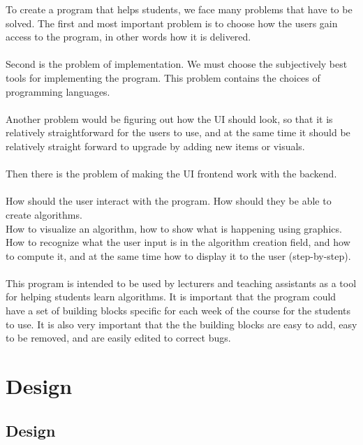 \documentclass[11pt]{article}
\begin{document}
To create a program that helps students, we face many problems that have to be solved. The first and most important problem is to choose how the users gain access to the program, in other words how it is delivered.
\\\\
Second is the problem of implementation. We must choose the subjectively best tools for implementing the program. This problem contains the choices of programming languages.
\\\\
Another problem would be figuring out how the UI should look, so that it is relatively straightforward for the users to use, and at the same time it should be relatively straight forward to upgrade by adding new items or visuals.
\\\\
Then there is the problem of making the UI frontend work with the backend.\\\\
How should the user interact with the program. How should they be able to create algorithms.\\
How to visualize an algorithm, how to show what is happening using graphics.\\
How to recognize what the user input is in the algorithm creation field, and how to compute it, and at the same time how to display it to the user (step-by-step).\\\\
This program is intended to be used by lecturers and teaching assistants as a tool for helping students learn algorithms. It is important that the program could have a set of building blocks specific for each week of the course for the students to use. It is also very important that the the building blocks are easy to add, easy to be removed, and are easily edited to correct bugs. 
\part{Design}
\chapter{Design}
\end{document}
